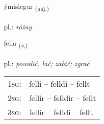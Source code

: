 \documentclass[frontgrid, backgrid]{flacards}\usepackage[]{graphicx}\usepackage[]{xcolor}
\begin{document}
\renewcommand{\flhead}{\vskip5pt \fboxsep=0pt {\small\bfseries\footnotesize Lýsingarorð | Adjective}}
\renewcommand{\fcfoot}{\vskip5pt \fboxsep=0pt \hspace{2pt}{\small\bfseries\footnotesize 2K}}

\renewcommand{\blhead}{\vskip5pt {\small\bfseries\footnotesize Lýsingarorð | Adjective }}
\renewcommand{\bcfoot}{\vskip5pt \hspace{2pt}{\small\bfseries\footnotesize 2K}}


{ýmislegur \small{\textsubscript{(\textit{adj.})}} \\[1ex] %
\textphonetic{[iːmɪstlɛɣʏr]} \\
pl.: \emph{różny} \\  [2ex]
\renewcommand*{\arraystretch}{0.8}
}

\renewcommand{\flhead}{\vskip5pt \fboxsep=0pt {\small\bfseries\footnotesize Sagnorð | Verb}}
\renewcommand{\fcfoot}{\vskip5pt \fboxsep=0pt \hspace{2pt}{\small\bfseries\footnotesize 2K}}

\renewcommand{\blhead}{\vskip5pt {\small\bfseries\footnotesize Sagnorð | Verb }}
\renewcommand{\bcfoot}{\vskip5pt \hspace{2pt}{\small\bfseries\footnotesize 2K}}


{fella \small{\textsubscript{(\textit{v.})}} \\[1ex] %
\textphonetic{[fɛtla]} \\
pl.: \emph{powalić, lać; zabić; zgrać} \\  [2ex]
\renewcommand*{\arraystretch}{0.8}
\begin{tabular}{p{1cm}l}
\textsc{1sg}: & felli -- felldi -- fellt \\ 
\textsc{2sg}: & fellir -- felldir -- fellt \\ 
\textsc{3sg}: & fellir -- felldi -- fellt \\ 
\end{tabular}
}
\end{document}
